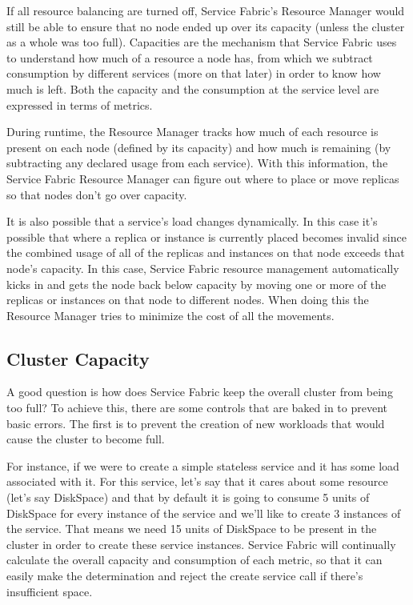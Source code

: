 If all resource balancing are turned off, Service Fabric’s Resource
Manager would still be able to ensure that no node ended up over its
capacity (unless the cluster as a whole was too full). Capacities are
the mechanism that Service Fabric uses to understand how much of a
resource a node has, from which we subtract consumption by different
services (more on that later) in order to know how much is left. Both
the capacity and the consumption at the service level are expressed in
terms of metrics.

During runtime, the Resource Manager tracks how much of each resource
is present on each node (defined by its capacity) and how much is
remaining (by subtracting any declared usage from each service). With
this information, the Service Fabric Resource Manager can figure out
where to place or move replicas so that nodes don’t go over capacity.

It is also possible that a service’s load changes dynamically. In this
case it’s possible that where a replica or instance is currently
placed becomes invalid since the combined usage of all of the replicas
and instances on that node exceeds that node’s capacity. In this case,
Service Fabric resource management automatically kicks in and gets the
node back below capacity by moving one or more of the replicas or
instances on that node to different nodes. When doing this the
Resource Manager tries to minimize the cost of all the movements.

\subsection{Cluster Capacity}
A good question is how does Service Fabric keep the overall cluster
from being too full? To achieve this, there are some controls that are
baked in to prevent basic errors. The first is to prevent the creation
of new workloads that would cause the cluster to become full.

For instance, if we were to create a simple stateless service and it
has some load associated with it. For this service, let’s say that it
cares about some resource (let’s say DiskSpace) and that by default it
is going to consume 5 units of DiskSpace for every instance of the
service and we’ll like to create 3 instances of the service. That
means we need 15 units of DiskSpace to be present in the cluster in
order to create these service instances. Service Fabric will
continually calculate the overall capacity and consumption of each
metric, so that it can easily make the determination and reject the
create service call if there’s insufficient space.

